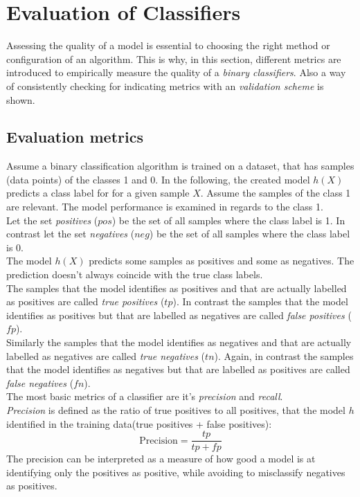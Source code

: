 \section{Evaluation of Classifiers}
Assessing the quality of a model is essential to choosing the right method or configuration of an algorithm. This is why, in this section, different metrics are introduced to empirically  measure the quality of a \emph{binary classifiers}. Also a way of consistently checking for indicating metrics with an \emph{validation scheme} is shown.
\\

\subsection*{Evaluation metrics}
Assume a binary classification algorithm is trained on a dataset, that has samples (data points) of the classes 1 and 0. In the following, the created model $h(X)$ predicts a class label for for a given sample $X$. Assume the samples of the class 1 are relevant. The model performance is examined in regards to the class 1. 
\\
Let the set \emph{positives} ($pos$) be the set of all samples where the class label is 1. In contrast let the set \emph{negatives} ($neg$) be the set of all samples where the class label is 0.
\\
The model $h(X)$ predicts some samples as positives and some as negatives. The prediction doesn't always coincide with the true class labels.
\\
The samples that the model identifies as positives and that are actually labelled as positives are called \emph{true positives} ($tp$).
In contrast the samples that the model identifies as positives but that are labelled as negatives are called \emph{false positives} ($fp$). 
\\
Similarly the samples that the model identifies as negatives and that are actually labelled as negatives are called \emph{true negatives} ($tn$).
Again, in contrast the samples that the model identifies as negatives but that are labelled as positives are called \emph{false negatives} ($fn$).
\\

The most basic metrics of a classifier are it's \emph{precision} and \emph{recall}.
\\

\emph{Precision} is defined as the ratio of true positives to all positives, that the model $h$ identified in the training data(true positives + false positives):
\begin{equation} \label{eq:ev1}
\text{Precision}=\frac{tp}{tp+fp}
\end{equation}
The precision can be interpreted as a measure of how good a model is at identifying only the positives as positive, while avoiding to misclassify negatives as positives. 
\\

